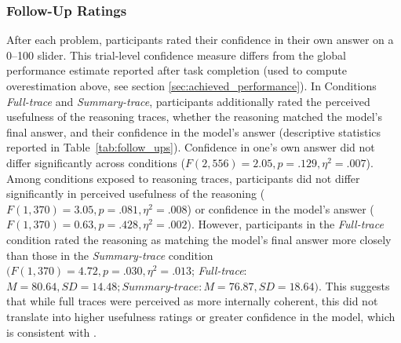 \documentclass[manuscript, anonymous=false,authorversion,review=false]{acmart}
\begin{document}
\subsubsection{Follow-Up Ratings}
After each problem, participants rated their confidence in their own answer on a 0--100 slider. This trial-level confidence measure differs from the global performance estimate reported after task completion (used to compute overestimation above, see section \ref{sec:achieved_performance}). In Conditions \textit{Full-trace} and \textit{Summary-trace}, participants additionally rated the perceived usefulness of the reasoning traces, whether the reasoning matched the model's final answer, and their confidence in the model's answer (descriptive statistics reported in Table~\ref{tab:follow_ups}). Confidence in one's own answer did not differ significantly across conditions ($F(2,556) = 2.05, p = .129, \eta^2 = .007$). Among conditions exposed to reasoning traces, participants did not differ significantly in perceived usefulness of the reasoning ($F(1,370) = 3.05, p = .081, \eta^2 = .008$) or confidence in the model's answer ($F(1,370) = 0.63, p = .428, \eta^2= .002$). However, participants in the \textit{Full-trace} condition rated the reasoning as matching the model's final answer more closely than those in the \textit{Summary-trace} condition $(F(1,370) = 4.72, p = .030, \eta^2= .013$; \textit{Full-trace}: $M = 80.64, SD = 14.48; \textit{Summary-trace}: M = 76.87, SD = 18.64)$. This suggests that while full traces were perceived as more internally coherent, this did not translate into higher usefulness ratings or greater confidence in the model, which is consistent with \cite{von2025knowing}.
\end{document}
